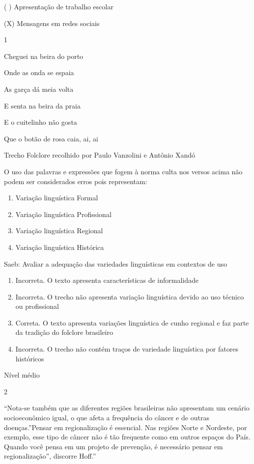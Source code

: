 {{\begin{escolha}
{\begin{itemize}
\begin{itemize}
( ) Apresentação de trabalho escolar

(X) Mensagens em redes sociais


\num{1}

Cheguei na beira do porto

Onde as onda se espaia

As garça dá meia volta

E senta na beira da praia

E o cuitelinho não gosta

Que o botão de rosa caia, ai, ai

Trecho Folclore recolhido por Paulo Vanzolini e Antônio Xandó

O uso das palavras e expressões que fogem à norma culta nos versos acima
não podem ser considerados erros pois representam:

\begin{enumerate}
\def\labelenumi{\alph{enumi})}
\item
  Variação linguística Formal
\item
  Variação linguística Profissional
\item
  Variação linguística Regional
\item
  Variação linguística Histórica
\end{enumerate}

Saeb: Avaliar a adequação das variedades linguísticas em contextos de
uso

\begin{enumerate}
\def\labelenumi{\arabic{enumi}.}
\item
  Incorreta. O texto apresenta características de informalidade
\item
  Incorreta. O trecho não apresenta variação linguística devido ao uso
  técnico ou profissional
\item
  Correta. O texto apresenta variações linguística de cunho regional e
  faz parte da tradição do folclore brasileiro
\item
  Incorreta. O trecho não contém traços de variedade linguística por
  fatores históricos
\end{enumerate}

Nível médio

\num{2}

``Nota-se também que as diferentes regiões brasileiras não apresentam um
cenário socioeconômico igual, o que afeta a frequência do câncer e de
outras doenças.''Pensar em regionalização é essencial. Nas regiões Norte
e Nordeste, por exemplo, esse tipo de câncer não é tão frequente como em
outros espaços do País. Quando você pensa em um projeto de prevenção, é
necessário pensar em regionalização'', discorre Hoff.''


\end{itemize}
\end{itemize}}
\end{escolha}}}
